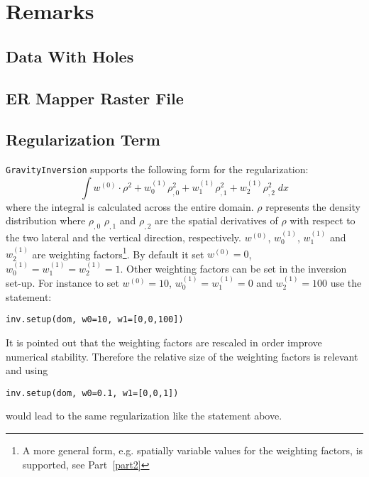 \section{Remarks}

\subsection{Data With Holes}\label{SEC:P1:GRAV:REMARK:DATAHOLES}


\subsection{ER Mapper Raster File}\label{SEC:P1:GRAV:REMARK:ERMAPPER}

\subsection{Regularization Term}\label{SEC:P1:GRAV:REMARK:REG}
\verb|GravityInversion| supports the following form for the regularization:
\begin{equation}
\int w^{(0)} \cdot \rho^2 + w^{(1)}_0  \rho_{,0}^2 +  w^{(1)}_1  \rho_{,1}^2 +  w^{(1)}_2  \rho_{,2}^2\; dx   
\end{equation}
where the integral is calculated across the entire domain. $\rho$ represents the density distribution 
where $\rho_{,0}$ $\rho_{,1}$ and $\rho_{,2}$ are the spatial derivatives of $\rho$ with respect to the 
two lateral and the vertical direction, respectively.  
$w^{(0)}$, $w^{(1)}_0$, $w^{(1)}_1$ and $w^{(1)}_2$ are weighting factors\footnote{A more general form, e.g. spatially variable values
for the weighting factors, is supported, see Part~\ref{part2}}. By default it set
$w^{(0)}=0$, $w^{(1)}_0=w^{(1)}_1=w^{(1)}_2=1$. Other weighting factors can be set in the inversion set-up. For instance to
set $w^{(0)}=10$,
$w^{(1)}_0=w^{(1)}_1=0$ and $w^{(1)}_2=100$ use the statement:
\begin{verbatim}
inv.setup(dom, w0=10, w1=[0,0,100])
\end{verbatim}
It is pointed out that the weighting factors are rescaled in order improve numerical stability. Therefore the relative size of
the weighting factors is relevant and using  
\begin{verbatim}
inv.setup(dom, w0=0.1, w1=[0,0,1])
\end{verbatim}
would lead to the same regularization like the statement above.


